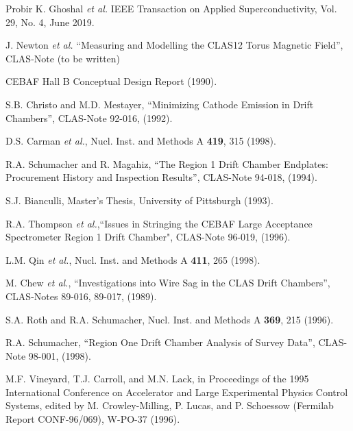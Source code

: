 \begin{thebibliography}{99}
 Probir K. Ghoshal {\it et al.} IEEE Transaction on Applied Superconductivity, Vol. 29, No. 4, June 2019.

J. Newton {\it et al.} ``Measuring and Modelling the CLAS12 Torus Magnetic Field'', CLAS-Note (to be written)






CEBAF Hall B Conceptual Design Report (1990).




S.B. Christo and M.D. Mestayer, ``Minimizing Cathode Emission in Drift 
Chambers'', CLAS-Note 92-016, (1992).















D.S. Carman {\it et al.}, Nucl. Inst. and Methods A {\bf 419}, 315 (1998).

R.A. Schumacher and R. Magahiz, ``The Region 1 Drift Chamber 
Endplates: Procurement History and Inspection Results'', CLAS-Note 
94-018, (1994).

S.J. Bianculli, Master's Thesis, University of Pittsburgh (1993).

R.A. Thompson {\it et al.},``Issues in Stringing the CEBAF Large 
Acceptance Spectrometer Region 1 Drift Chamber", CLAS-Note 96-019, 
(1996).

 L.M. Qin {\it et al.}, Nucl. Inst. and Methods A {\bf 411}, 265 (1998).

 M. Chew {\it et al.}, ``Investigations into Wire Sag in the
CLAS Drift Chambers'', CLAS-Notes 89-016, 89-017, (1989).

S.A. Roth and R.A. Schumacher, Nucl. Inst. and Methods A {\bf 369}, 215 (1996).

R.A. Schumacher, ``Region One Drift Chamber Analysis of Survey Data'',
CLAS-Note 98-001, (1998).



M.F. Vineyard, T.J. Carroll, and M.N. Lack, in Proceedings of the 1995 International
Conference on Accelerator and Large Experimental Physics Control Systems, 
edited by M. Crowley-Milling, P. Lucas, and P. Schoessow (Fermilab Report 
CONF-96/069), W-PO-37 (1996).


\end{thebibliography}
